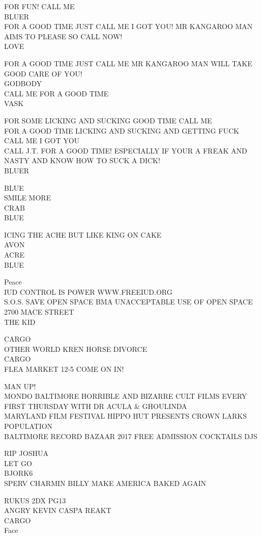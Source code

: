 \documentclass[10pt,letterpaper]{article}
\begin{document}
FOR FUN!  CALL ME\\
BLUER\\
FOR A GOOD TIME JUST CALL ME I GOT YOU!  MR KANGAROO MAN AIMS TO PLEASE SO CALL NOW!\\
LOVE

FOR A GOOD TIME JUST CALL ME MR KANGAROO MAN WILL TAKE GOOD CARE OF YOU!\\
GODBODY\\
CALL ME FOR A GOOD TIME\\
VASK

FOR SOME LICKING AND SUCKING GOOD TIME CALL ME\\
FOR A GOOD TIME LICKING AND SUCKING AND GETTING FUCK CALL ME I GOT YOU\\
CALL J.T. FOR A GOOD TIME!   ESPECIALLY IF YOUR A FREAK AND NASTY AND KNOW HOW TO SUCK A DICK!\\
BLUER

BLUE\\
SMILE MORE\\
CRAB\\
BLUE

ICING THE ACHE BUT LIKE KING ON CAKE\\
AVON\\
ACRE\\
BLUE

Peace\\
IUD CONTROL IS POWER WWW.FREEIUD.ORG\\
S.O.S. SAVE OPEN SPACE BMA UNACCEPTABLE USE OF OPEN SPACE 2700 MACE STREET\\
THE KID

CARGO\\
OTHER WORLD KREN HORSE DIVORCE\\
CARGO\\
FLEA MARKET 12{-}5 COME ON IN!

MAN UP!\\
MONDO BALTIMORE HORRIBLE AND BIZARRE CULT FILMS EVERY FIRST THURSDAY WITH DR ACULA \& GHOULINDA\\
MARYLAND FILM FESTIVAL HIPPO HUT PRESENTS CROWN LARKS POPULATION\\
BALTIMORE RECORD BAZAAR 2017 FREE ADMISSION COCKTAILS DJS

RIP JOSHUA\\
LET GO\\
BJORK6\\
SPERV CHARMIN BILLY MAKE AMERICA BAKED AGAIN

RUKUS 2DX PG13\\
ANGRY KEVIN CASPA REAKT\\
CARGO\\
Face
\end{document}

